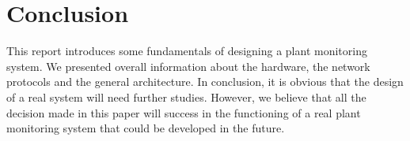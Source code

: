 \section{Conclusion}
This report introduces some fundamentals of designing a plant monitoring system. We presented overall information about the hardware, the network protocols and the general architecture. In conclusion, it is obvious that the design of a real system will need further studies. However, we believe that all the decision made in this paper will success in the functioning of a real plant monitoring system that could be developed in the future.